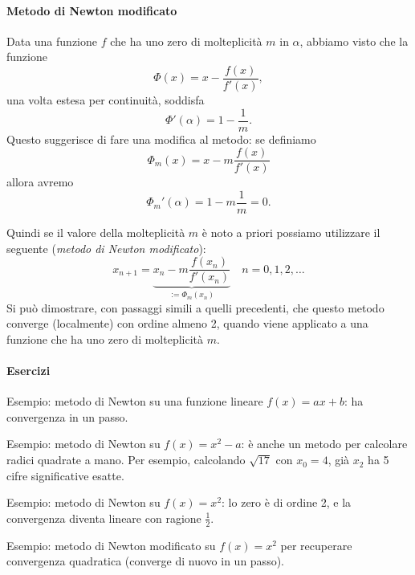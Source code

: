 \documentclass[a4paper]{report}
\theoremstyle{definiton}
\theoremstyle{remark}
\begin{document}
\paragraph{Metodo di Newton modificato} Data una funzione $f$ che ha uno zero di molteplicità $m$ in $\alpha$, abbiamo visto che la funzione
\[
    \Phi(x) = x - \frac{f(x)}{f'(x)},
\]
una volta estesa per continuità, soddisfa
\[
    \Phi'(\alpha) = 1 - \frac{1}{m}.
\]
Questo suggerisce di fare una modifica al metodo: se definiamo
\[
    \Phi_m(x) = x - m \frac{f(x)}{f'(x)}
\]
allora avremo
\[
    \Phi_m'(\alpha) = 1 - m\frac{1}{m} = 0.
\]

Quindi se il valore della molteplicità $m$ è noto a priori possiamo utilizzare il seguente (\emph{metodo di Newton modificato}):
\begin{equation} \label{newtonmod}
    x_{n+1} = \underbrace{x_n - m\frac{f(x_n)}{f'(x_n)}}_{:=\Phi_m(x_n)} \quad n = 0,1,2,\dots    
\end{equation}
Si può dimostrare, con passaggi simili a quelli precedenti, che questo metodo converge (localmente) con ordine almeno 2, quando viene applicato a una funzione che ha uno zero di molteplicità $m$.

\paragraph{Esercizi}

Esempio: metodo di Newton su una funzione lineare $f(x) = a x + b$: ha convergenza in un passo.

Esempio: metodo di Newton su $f(x) = x^2-a$: è anche un metodo per calcolare radici quadrate a mano. Per esempio, calcolando $\sqrt{17}$ con $x_0 = 4$, già $x_2$ ha 5 cifre significative esatte.

Esempio: metodo di Newton su $f(x) = x^2$: lo zero è di ordine 2, e la convergenza diventa lineare con ragione $\frac12$.

Esempio: metodo di Newton modificato su $f(x) = x^2$ per recuperare convergenza quadratica (converge di nuovo in un passo).
\end{document}
